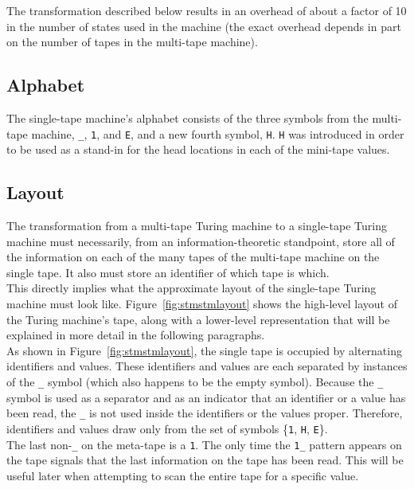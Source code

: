\documentclass[11pt]{report}
\begin{document}
The transformation described below results in an overhead of about a factor of 10 in the number of states used in the machine (the exact overhead depends in part on the number of tapes in the multi-tape machine). 

\subsection{Alphabet}

The single-tape machine's alphabet consists of the three symbols from the multi-tape machine, \texttt{\_}, \texttt{1}, and \texttt{E}, and a new fourth symbol, \texttt{H}. \texttt{H} was introduced in order to be used as a stand-in for the head locations in each of the mini-tape values.

\subsection{Layout}

The transformation from a multi-tape Turing machine to a single-tape Turing machine must necessarily, from an information-theoretic standpoint, store all of the information on each of the many tapes of the multi-tape machine on the single tape. It also must store an identifier of which tape is which. \\

This directly implies what the approximate layout of the single-tape Turing machine must look like. Figure~\ref{fig:stmstmlayout} shows the high-level layout of the Turing machine's tape, along with a lower-level representation that will be explained in more detail in the following paragraphs. \\

As shown in Figure~\ref{fig:stmstmlayout}, the single tape is occupied by alternating identifiers and values. These identifiers and values are each separated by instances of the \texttt{\_} symbol (which also happens to be the empty symbol). Because the \texttt{\_} symbol is used as a separator and as an indicator that an identifier or a value has been read, the \texttt{\_} is not used inside the identifiers or the values proper. Therefore, identifiers and values draw only from the set of symbols \{\texttt{1}, \texttt{H}, \texttt{E}\}. \\

The last non-\texttt{\_} on the meta-tape is a \texttt{1}. The only time the \texttt{1\_} pattern appears on the tape signals that the last information on the tape has been read. This will be useful later when attempting to scan the entire tape for a specific value.
\end{document}
